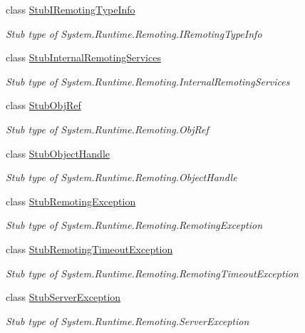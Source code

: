 \begin{DoxyCompactItemize}
class \hyperlink{class_system_1_1_runtime_1_1_remoting_1_1_fakes_1_1_stub_i_remoting_type_info}{Stub\-I\-Remoting\-Type\-Info}
\begin{DoxyCompactList}\small\item\em Stub type of System.\-Runtime.\-Remoting.\-I\-Remoting\-Type\-Info\end{DoxyCompactList}\item 
class \hyperlink{class_system_1_1_runtime_1_1_remoting_1_1_fakes_1_1_stub_internal_remoting_services}{Stub\-Internal\-Remoting\-Services}
\begin{DoxyCompactList}\small\item\em Stub type of System.\-Runtime.\-Remoting.\-Internal\-Remoting\-Services\end{DoxyCompactList}\item 
class \hyperlink{class_system_1_1_runtime_1_1_remoting_1_1_fakes_1_1_stub_obj_ref}{Stub\-Obj\-Ref}
\begin{DoxyCompactList}\small\item\em Stub type of System.\-Runtime.\-Remoting.\-Obj\-Ref\end{DoxyCompactList}\item 
class \hyperlink{class_system_1_1_runtime_1_1_remoting_1_1_fakes_1_1_stub_object_handle}{Stub\-Object\-Handle}
\begin{DoxyCompactList}\small\item\em Stub type of System.\-Runtime.\-Remoting.\-Object\-Handle\end{DoxyCompactList}\item 
class \hyperlink{class_system_1_1_runtime_1_1_remoting_1_1_fakes_1_1_stub_remoting_exception}{Stub\-Remoting\-Exception}
\begin{DoxyCompactList}\small\item\em Stub type of System.\-Runtime.\-Remoting.\-Remoting\-Exception\end{DoxyCompactList}\item 
class \hyperlink{class_system_1_1_runtime_1_1_remoting_1_1_fakes_1_1_stub_remoting_timeout_exception}{Stub\-Remoting\-Timeout\-Exception}
\begin{DoxyCompactList}\small\item\em Stub type of System.\-Runtime.\-Remoting.\-Remoting\-Timeout\-Exception\end{DoxyCompactList}\item 
class \hyperlink{class_system_1_1_runtime_1_1_remoting_1_1_fakes_1_1_stub_server_exception}{Stub\-Server\-Exception}
\begin{DoxyCompactList}\small\item\em Stub type of System.\-Runtime.\-Remoting.\-Server\-Exception\end{DoxyCompactList}\item 

\end{DoxyCompactItemize}
